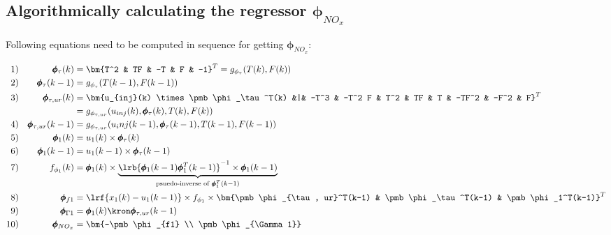 \subsection{Algorithmically calculating the regressor $\pmb \phi_{NO_x}$}

Following equations need to be computed in sequence for getting $\pmb \phi_{NO_x}$:


\begin{align*}
        1)&& \pmb \phi_\tau(k) &= \bm{T^2 & TF & -T & F & -1}^T  = g_{\phi_\tau}(T(k), F(k))\\
        2)&& \pmb \phi_\tau(k-1)&= g_{\phi_\tau}(T(k-1), F(k-1))\\
        3)&& \pmb \phi_{\tau, ur}(k)&= \bm{u_{inj}(k) \times \pmb \phi_\tau^T(k) &|&
                                          -T^3 & -T^2 F & T^2 & TF & T & -TF^2 & -F^2 & F}^T \\
                                  &&&= g_{\phi_{\tau, ur}} (u_{inj}(k), \pmb \phi_\tau(k), T(k), F(k))\\
        4)&& \pmb \phi_{\tau, ur}(k-1)&= g_{\phi_{\tau, ur}} (u_inj(k-1), \pmb \phi_\tau(k-1), T(k-1), F(k-1))\\
        5)&& \pmb \phi_1(k) &= u_1(k) \times \pmb \phi_\tau(k)\\
        6)&& \pmb \phi_1(k-1) &= u_1(k-1) \times \pmb \phi_\tau(k-1) \\
        7)&& f_{\phi_1}(k) &= \pmb \phi_1(k) \times \underbrace{\lrb{\pmb \phi_1(k-1) \pmb \phi_1^T(k-1)}^{-1} \times \pmb \phi_1(k-1)}_{\text{psuedo-inverse of } \pmb \phi_1^T(k-1)}\\
        8)&& \pmb \phi_{f1} &= \lrf{x_1(k) - u_1(k-1)} \times f_{\phi_1} \times
                                \bm{\pmb \phi_{\tau, ur}^T(k-1) & \pmb \phi_\tau^T(k-1) & \pmb \phi_1^T(k-1)}^T\\
        9)&& \pmb \phi_{\Gamma 1} &= \pmb \phi_1 (k) \kron \pmb \phi_{\tau, ur} (k-1) \\
        10)&& \pmb \phi_{NO_x} &= \bm{-\pmb \phi_{f1} \\ \pmb \phi_{\Gamma 1}}
\end{align*}
